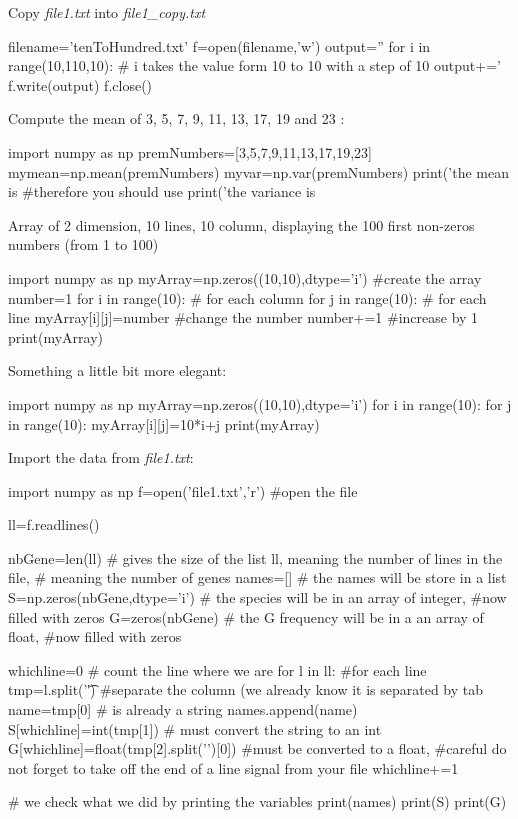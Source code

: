 \documentclass[article,10pt]{scrartcl}
\begin{document}
Copy \textit{file1.txt} into \textit{file1\_copy.txt}
\begin{python}
filename='tenToHundred.txt'
f=open(filename,'w')
output=''
for i in range(10,110,10): # i takes the value form 10 to 10 with a step of 10
   output+='%
f.write(output)
f.close()
\end{python}
Compute the mean of 3, 5, 7, 9, 11, 13, 17, 19 and 23 :
\begin{python}
import numpy as np
premNumbers=[3,5,7,9,11,13,17,19,23]
mymean=np.mean(premNumbers)
myvar=np.var(premNumbers)
print('the mean is %
#therefore you should use %
print('the variance is %
\end{python}

Array of 2 dimension, 10 lines, 10 column, displaying the 100 first non-zeros numbers (from 1 to 100)\\
\begin{python}
import numpy as np
myArray=np.zeros((10,10),dtype='i') #create the array
number=1
for i in range(10): # for each column
   for j in range(10): # for each line
      myArray[i][j]=number #change the number
      number+=1 #increase by 1
print(myArray)
\end{python}
Something a little bit more elegant:\\
\begin{python}
import numpy as np
myArray=np.zeros((10,10),dtype='i')
for i in range(10):
   for j in range(10):
      myArray[i][j]=10*i+j
print(myArray)
\end{python}
Import the data from \textit{file1.txt}:
\begin{python}
import numpy as np
f=open('file1.txt','r') #open the file

ll=f.readlines()

nbGene=len(ll) # gives the size of the list ll, meaning the number of lines in the file,
# meaning the number of genes
names=[] # the names will be store in a list
S=np.zeros(nbGene,dtype='i') # the species will be in an array of integer, 
#now filled with zeros
G=zeros(nbGene) # the G frequency will be in a an array of float, 
#now filled with zeros

whichline=0 # count the line where we are
for l in ll: #for each line
   tmp=l.split('\t') #separate the column (we already know it is separated by tab
   name=tmp[0] # is already a string
   names.append(name)
   S[whichline]=int(tmp[1]) # must convert the string to an int
   G[whichline]=float(tmp[2].split('\n')[0])  #must be converted to a float, 
   #careful do not forget to take off the end of a line signal from your file
   whichline+=1

# we check what we did by printing the variables
print(names) 
print(S)
print(G)
\end{python}
\end{document}
